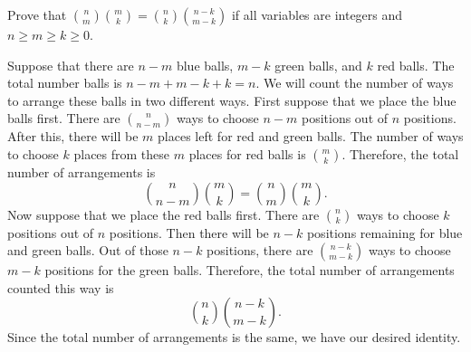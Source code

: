 \begin{question}
    Prove that $\binom{n}{m}\binom{m}{k} = \binom{n}{k}\binom{n - k}{m - k}$ if all variables are integers and $n \geq m \geq k \geq 0$.
\end{question}
\begin{solution}
    Suppose that there are $n - m$ blue balls, $m - k$ green balls, and $k$ red
    balls. The total number balls is $n - m + m - k + k = n$. We will count the
    number of ways to arrange these balls in two different ways. First suppose
    that we place the blue balls first. There are $\binom{n}{n - m}$ ways to
    choose $n - m$ positions out of $n$ positions. After this, there will be
    $m$ places left for red and green balls. The number of ways to choose $k$
    places from these $m$ places for red balls is $\binom{m}{k}$. Therefore,
    the total number of arrangements is
    \[ \binom{n}{n - m}\binom{m}{k} = \binom{n}{m}\binom{m}{k}. \]
    Now suppose that we place the red balls first. There are $\binom{n}{k}$
    ways to choose $k$ positions out of $n$ positions. Then there will be $n -
    k$ positions remaining for blue and green balls. Out of those $n - k$
    positions, there are $\binom{n - k}{m - k}$ ways to choose $m - k$
    positions for the green balls. Therefore, the total number of arrangements
    counted this way is
    \[ \binom{n}{k}\binom{n - k}{m - k}. \]
    Since the total number of arrangements is the same, we have our desired
    identity.
\end{solution}

